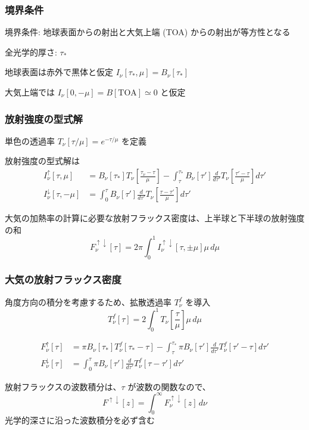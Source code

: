 \documentclass[unicode,colorlinks]{beamer}
\begin{document}
\begin{frame}
	\frametitle{境界条件}
	境界条件: 地球表面からの射出と大気上端 (TOA) からの射出が等方性となる

	全光学的厚さ: $\tau_*$

	地球表面は赤外で黒体と仮定 $I_\nu[\tau_*,\mu]=B_\nu[\tau_*]$

	大気上端では $I_\nu[0,-\mu]=B[\mathrm{TOA}]\simeq0$ と仮定
\end{frame}

\begin{frame}
	\frametitle{放射強度の型式解}
	単色の透過率 $T_\nu[\tau/\mu]=e^{-\tau/\mu}$ を定義

	放射強度の型式解は
	\begin{align*}
		I^\uparrow_\nu[\tau,\mu]
			&=B_\nu[\tau_*]T_\nu\left[\frac{\tau_\nu-\tau}{\mu}\right]
			-\int^{\tau_*}_\tau B_\nu[\tau']\frac{d}{d\tau'}T_\nu\left[\frac{\tau'-\tau}{\mu}\right]d\tau'\\
		I^\downarrow_\nu[\tau,-\mu]
			&=\int^\tau_0 B_\nu[\tau']\frac{d}{d\tau'}T_\nu\left[\frac{\tau-\tau'}{\mu}\right]d\tau'
	\end{align*}

	大気の加熱率の計算に必要な放射フラックス密度は、上半球と下半球の放射強度の和
	\[F^{\uparrow\downarrow}_\nu[\tau]=2\pi\int^1_0 I^{\uparrow\downarrow}_\nu[\tau,\pm\mu]\mu\,d\mu\]
\end{frame}

\begin{frame}
	\frametitle{大気の放射フラックス密度}
	角度方向の積分を考慮するため、拡散透過率 $T^f_\nu$ を導入
	\[T^f_\nu[\tau]=2\int^1_0 T_\nu\left[\frac{\tau}{\mu}\right]\mu\,d\mu\]

	\begin{align*}
		F^\uparrow_\nu[\tau]
			&=\pi B_\nu[\tau_*]T^f_\nu[\tau_*-\tau]
			-\int^{\tau_*}_\tau \pi B_\nu[\tau']\frac{d}{d\tau'}T^f_\nu[\tau'-\tau]d\tau'\\
		F^\downarrow_\nu[\tau]
			&=\int^\tau_0 \pi B_\nu[\tau']\frac{d}{d\tau'}T^f_\nu[\tau-\tau']d\tau'
	\end{align*}

	放射フラックスの波数積分は、$\tau$ が波数の関数なので、
	\[F^{\uparrow\downarrow}[z]=\int^\infty_0 F^{\uparrow\downarrow}_\nu[z]\,d\nu\]
	光学的深さに沿った波数積分を必ず含む
\end{frame}

% 
\end{document}

